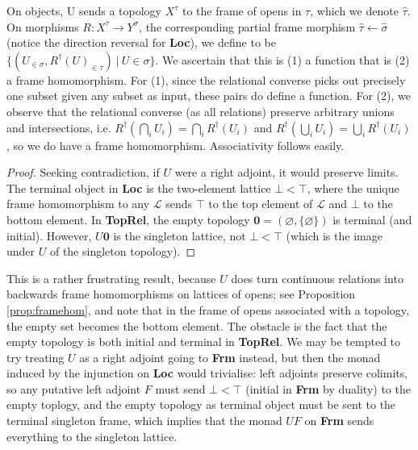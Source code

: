 \begin{fullwidth}
\begin{defn}
On objects, U sends a topology $X^\tau$ to the frame of opens in $\tau$, which we denote $\hat{\tau}$.\\
On morphisms $R: X^\tau \rightarrow Y^\sigma$, the corresponding partial frame morphism $\hat{\tau} \leftarrow \hat{\sigma}$ (notice the direction reversal for \textbf{Loc}), we define to be $\{(U_{\in \sigma},R^\dagger(U)_{\in \tau}) \ | \ U \in \sigma\}$. We ascertain that this is (1) a function that is (2) a frame homomorphism. For (1), since the relational converse picks out precisely one subset given any subset as input, these pairs do define a function. For (2), we observe that the relational converse (as all relations) preserve arbitrary unions and intersections, i.e. $R^\dagger(\bigcap\limits_i U_i) = \bigcap\limits_i R^\dagger(U_i)$ and $R^\dagger(\bigcup\limits_i U_i) = \bigcup\limits_i R^\dagger(U_i)$, so we do have a frame homomorphism. Associativity follows easily.
\end{defn}

\begin{proposition}
\begin{proof}
Seeking contradiction, if $U$ were a right adjoint, it would preserve limits. The terminal object in \textbf{Loc} is the two-element lattice $\bot < \top$, where the unique frame homomorphism to any $\mathcal{L}$ sends $\top$ to the top element of $\mathcal{L}$ and $\bot$ to the bottom element. In \textbf{TopRel}, the empty topology $\textbf{0} = (\varnothing, \{\varnothing\})$ is terminal (and initial). However, $U\textbf{0}$ is the singleton lattice, not $\bot < \top$ (which is the image under $U$ of the singleton topology).
\end{proof}
\end{proposition}

This is a rather frustrating result, because $U$ does turn continuous relations into backwards frame homomorphisms on lattices of opens; see Proposition \ref{prop:framehom}, and note that in the frame of opens associated with a topology, the empty set becomes the bottom element. The obstacle is the fact that the empty topology is both initial and terminal in \textbf{TopRel}. We may be tempted to try treating $U$ as a right adjoint going to \textbf{Frm} instead, but then the monad induced by the injunction on \textbf{Loc} would trivialise: left adjoints preserve colimits, so any putative left adjoint $F$ must send $\bot < \top$ (initial in \textbf{Frm} by duality) to the empty toplogy, and the empty topology as terminal object must be sent to the terminal singleton frame, which implies that the monad $UF$ on \textbf{Frm} sends everything to the singleton lattice.


\end{fullwidth}
